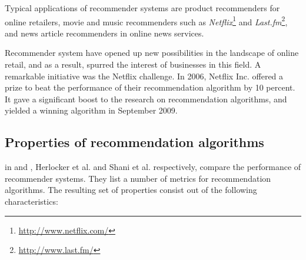 Typical applications of recommender systems are product recommenders for online retailers, movie and music recommenders such as \emph{Netflix}\footnote{\url{http://www.netflix.com/}} and \emph{Last.fm}\footnote{\url{http://www.last.fm/}}, and news article recommenders in online news services\cite{levy:2010, rajaraman:2012, celma:2008:phd}.

Recommender system have opened up new possibilities in the landscape of online retail, and as a result, spurred the interest of businesses in this field. A remarkable initiative was the Netflix challenge. In 2006, Netflix Inc. offered a prize to beat the performance of their recommendation algorithm by 10 percent. It gave a significant boost to the research on recommendation algorithms, and yielded a winning algorithm in September 2009\cite{bell:2007, rajaraman:2012}.


\subsection{Properties of recommendation algorithms}\label{chapter:literature_study:section:computer:subsection:properties}

in \cite{herlocker:2004:ECF:963770.963772} and \cite{shani:2011:9780387858197}, Herlocker et al. and Shani et al.  respectively, compare the performance of recommender systems. They list a number of metrics for recommendation algorithms. The resulting set of properties consist out of the following characteristics:

